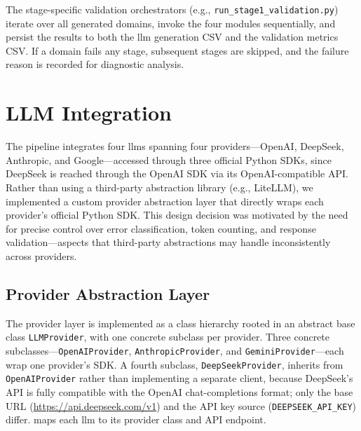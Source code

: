 The stage-specific validation orchestrators (e.g., \texttt{run\_stage1\_validation.py}) iterate over all generated domains, invoke the four modules sequentially, and persist the results to both the \gls{llm} generation CSV and the validation metrics CSV.
If a domain fails any stage, subsequent stages are skipped, and the failure reason is recorded for diagnostic analysis.


\section{LLM Integration}
\label{sec:impl:llm_integration}

The pipeline integrates four \glspl{llm} spanning four providers---OpenAI, DeepSeek, Anthropic, and Google---accessed through three official Python SDKs, since DeepSeek is reached through the OpenAI SDK via its OpenAI-compatible API.
Rather than using a third-party abstraction library (e.g., LiteLLM), we implemented a custom provider abstraction layer that directly wraps each provider's official Python SDK.
This design decision was motivated by the need for precise control over error classification, token counting, and response validation---aspects that third-party abstractions may handle inconsistently across providers.

\subsection{Provider Abstraction Layer}
\label{sec:impl:llm:providers}

The provider layer is implemented as a class hierarchy rooted in an abstract base class \texttt{LLM\allowbreak Provider}, with one concrete subclass per provider.
Three concrete subclasses---\texttt{OpenAI\allowbreak Provider}, \texttt{Anthropic\allowbreak Provider}, and \texttt{Gemini\allowbreak Provider}---each wrap one provider's SDK.
A fourth subclass, \texttt{DeepSeek\allowbreak Provider}, inherits from \texttt{OpenAI\allowbreak Provider} rather than implementing a separate client, because DeepSeek's API is fully compatible with the OpenAI chat-completions format; only the base URL (\url{https://api.deepseek.com/v1}) and the API key source (\nolinkurl{DEEPSEEK_API_KEY}) differ.
 maps each \gls{llm} to its provider class and API endpoint.

